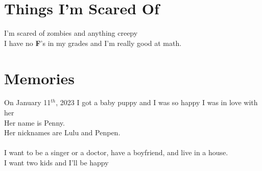 \documentclass[10pt]{report}
\newcommand{\fbd}{
    \setlength{\fboxsep}{0pt}
    \setlength{\fboxrule}{3pt}
  }
\begin{document}
\section*{Things I'm Scared Of}
\begin{minipage}{0.45\linewidth}
I'm scared of zombies and anything creepy\\
I have no \textbf{F}'s in my grades and I'm really good at math.\\
\end{minipage}
\begin{minipage}{0.45\linewidth}
  \hfill
  {\fbd
    }
\end{minipage}

\section*{Memories}
\begin{minipage}{0.45\linewidth} 
On January 11$^{th}$, 2023 I got a baby puppy and I was so happy I was in
love with her\\
Her name is Penny. \\
Her nicknames are Lulu and Penpen.\\
\;\\
I want to be a singer or a doctor, have a boyfriend, and live in a house.\\
I want two kids and I'll be happy
\end{minipage}
\begin{minipage}{0.45\linewidth}
  \hfill
  {\fbd
    }
\end{minipage}
\end{document}
